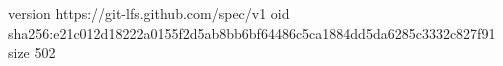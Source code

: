 version https://git-lfs.github.com/spec/v1
oid sha256:e21c012d18222a0155f2d5ab8bb6bf64486c5ca1884dd5da6285c3332c827f91
size 502
